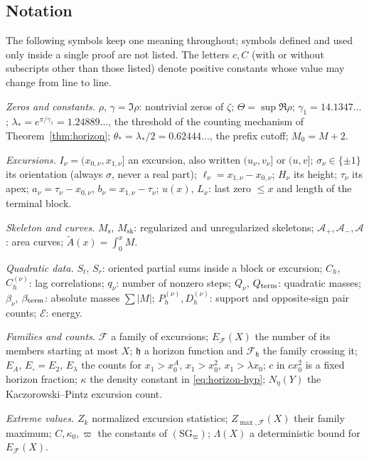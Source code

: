 \documentclass[11pt]{amsart}
\numberwithin{equation}{section}
\theoremstyle{plain}
\theoremstyle{definition}
\theoremstyle{remark}
\newcommand{\Ms}{M_{\mathrm{s}}}
\newcommand{\Msk}{M_{\mathrm{sk}}}
\newcommand{\Ap}{\mathcal{A}_{+}}
\newcommand{\Am}{\mathcal{A}_{-}}
\newcommand{\Anet}{\mathcal{A}}
\newcommand{\En}{\mathcal{E}}
\newcommand{\F}{\mathcal{F}}
\begin{document}
\subsection*{Notation}
\label{subsec:notation}
The following symbols keep one meaning throughout; symbols defined and used
only inside a single proof are not listed. The letters $c,C$ (with or without
subscripts other than those listed) denote positive constants whose value may
change from line to line.

\smallskip
\noindent\emph{Zeros and constants.}
$\rho$, $\gamma=\Im\rho$: nontrivial zeros of $\zeta$;
$\Theta=\sup\Re\rho$;
$\gamma_1=14.1347\ldots$;
$\lambda_*=e^{\pi/\gamma_1}=1.24889\ldots$, the threshold of the counting
mechanism of Theorem~\ref{thm:horizon};
$\theta_*=\lambda_*/2=0.62444\ldots$, the prefix cutoff;
$M_0=M+2$.

\smallskip
\noindent\emph{Excursions.}
$I_\nu=(x_{0,\nu},x_{1,\nu}]$ an excursion, also written $(u_\nu,v_\nu]$ or
$(u,v]$; $\sigma_\nu\in\{\pm1\}$ its orientation (always $\sigma$, never a
real part); $\ell_\nu=x_{1,\nu}-x_{0,\nu}$; $H_\nu$ its height; $\tau_\nu$ its
apex; $a_\nu=\tau_\nu-x_{0,\nu}$, $b_\nu=x_{1,\nu}-\tau_\nu$;
$u(x)$, $L_x$: last zero $\le x$ and length of the terminal block.

\smallskip
\noindent\emph{Skeleton and curves.}
$\Ms$, $\Msk$: regularized and unregularized skeletons;
$\Ap,\Am,\Anet$: area curves; $\widetilde A(x)=\int_0^xM$.

\smallskip
\noindent\emph{Quadratic data.}
$S_t$, $S_r$: oriented partial sums inside a block or excursion;
$C_h$, $C_h^{(\nu)}$: lag correlations; $q_\nu$: number of nonzero steps;
$Q_\nu$, $Q_{\rm term}$: quadratic masses; $\beta_\nu$, $\beta_{\rm term}$:
absolute masses $\sum|M|$; $P_h^{(\nu)},D_h^{(\nu)}$: support and
opposite-sign pair counts; $\En$: energy.

\smallskip
\noindent\emph{Families and counts.}
$\F$ a family of excursions; $E_\F(X)$ the number of its members starting at
most $X$; $\mathfrak h$ a horizon function and $\F_{\mathfrak h}$ the family
crossing it; $E_A$, $E_\square=E_2$, $E_\lambda$ the counts for
$x_1>x_0^A$, $x_1>x_0^2$, $x_1>\lambda x_0$; $c$ in $cx_0^2$ is a fixed
horizon fraction; $\kappa$ the density constant in \eqref{eq:horizon-hyp};
$N_\eta(Y)$ the Kaczorowski--Pintz excursion count.

\smallskip
\noindent\emph{Extreme values.}
$Z_k$ normalized excursion statistics; $Z_{\max,\F}(X)$ their family maximum;
$C,\kappa_0,\varpi$ the constants of $(\mathrm{SG}_\varpi)$;
$\Lambda(X)$ a deterministic bound for $E_\F(X)$.
\end{document}
